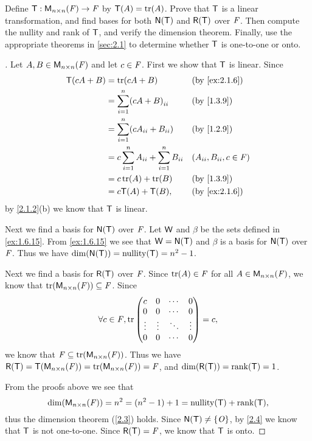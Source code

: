 \exercisesection

\setcounter{ex}{5}
\begin{ex}\label{ex:2.1.6}
  Define \(\T : \ms[n][n][\F] \to \F\) by \(\T(A) = \tr[A]\).
  Prove that \(\mathsf{T}\) is a linear transformation, and find bases for both \(\ns{\T}\) and \(\rg{\T}\) over \(\mathit{F}\).
  Then compute the nullity and rank of \(\mathsf{T}\), and verify the dimension theorem.
  Finally, use the appropriate theorems in \cref{sec:2.1} to determine whether \(\mathsf{T}\) is one-to-one or onto.
\end{ex}

\begin{proof}[]
  Let \(A, B \in \ms[n][n][\F]\) and let \(c \in \mathit{F}\).
  First we show that \(\mathsf{T}\) is linear.
  Since
  \begin{align*}
    \T(cA + B) & = \tr[cA + B]                                       &  & \by{ex:2.1.6}                \\
               & = \sum_{i = 1}^n \pa{cA + B}_{i i}                  &  & \by{1.3.9}                   \\
               & = \sum_{i = 1}^n \pa{cA_{i i} + B_{i i}}            &  & \by{1.2.9}                   \\
               & = c \sum_{i = 1}^n A_{i i} + \sum_{i = 1}^n B_{i i} &  & (A_{i i}, B_{i i}, c \in \F) \\
               & = c \tr[A] + \tr[B]                                 &  & \by{1.3.9}                   \\
               & = c \T(A) + \T(B),                                  &  & \by{ex:2.1.6}
  \end{align*}
  by \cref{2.1.2}(b) we know that \(\mathsf{T}\) is linear.

  Next we find a basis for \(\ns{\T}\) over \(\mathit{F}\).
  Let \(\mathsf{W}\) and \(\beta\) be the sets defined in \cref{ex:1.6.15}.
  From \cref{ex:1.6.15} we see that \(\W = \ns{\T}\) and \(\beta\) is a basis for \(\ns{\T}\) over \(\mathit{F}\).
  Thus we have \(\dim(\ns{\T}) = \nt{\T} = n^2 - 1\).

  Next we find a basis for \(\rg{\T}\) over \(\mathit{F}\).
  Since \(\tr[A] \in \F\) for all \(A \in \ms[n][n][\F]\), we know that \(\tr[\ms[n][n][\F]] \subseteq \F\).
  Since
  \[
    \forall c \in \F, \tr\begin{pmatrix}
      c      & 0      & \cdots & 0      \\
      0      & 0      & \cdots & 0      \\
      \vdots & \vdots & \ddots & \vdots \\
      0      & 0      & \cdots & 0
    \end{pmatrix} = c,
  \]
  we know that \(\F \subseteq \tr[\ms[n][n][\F]]\).
  Thus we have \(\rg{\T} = \T(\ms[n][n][\F]) = \tr[\ms[n][n][\F]] = \F\), and \(\dim(\rg{\T}) = \rk{\T} = 1\).

  From the proofs above we see that
  \[
    \dim(\ms[n][n][\F]) = n^2 = (n^2 - 1) + 1 = \nt{\T} + \rk{\T},
  \]
  thus the dimension theorem (\cref{2.3}) holds.
  Since \(\ns{\T} \neq \set{\zm}\), by \cref{2.4} we know that \(\mathsf{T}\) is not one-to-one.
  Since \(\rg{\T} = \F\), we know that \(\mathsf{T}\) is onto.
\end{proof}


